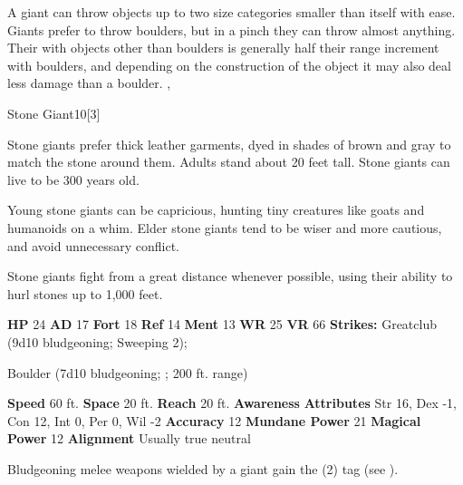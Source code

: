         A giant can throw objects up to two size categories smaller than itself with ease.
        Giants prefer to throw boulders, but in a pinch they can throw almost anything.
        Their  with objects other than boulders is generally half their range increment with boulders, and depending on the construction of the object it may also deal less damage than a boulder.
  ,
  \begin{monsubsection}{Stone Giant}{10}[3]
    \vspace{-1em}\vspace{-1em}
    \vspace{0em}

    
        Stone giants prefer thick leather garments, dyed in shades of brown and gray to match the stone around them. Adults stand about 20 feet tall. Stone giants can live to be 300 years old.

        Young stone giants can be capricious, hunting tiny creatures like goats and humanoids on a whim.
        Elder stone giants tend to be wiser and more cautious, and avoid unnecessary conflict.
      
        Stone giants fight from a great distance whenever possible, using their ability to hurl stones up to 1,000 feet.
      

    \begin{spellcontent}
      \begin{spelltargetinginfo}
        \pari \textbf{HP} 24 \monsep
          \textbf{AD} 17 \monsep
          \textbf{Fort} 18 \monsep
          \textbf{Ref} 14 \monsep
          \textbf{Ment} 13
        \pari \textbf{WR} 25 \monsep
        \textbf{VR} 66
        \pari \textbf{Strikes:}
            Greatclub  (9d10 bludgeoning; Sweeping 2);
\par Boulder  (7d10 bludgeoning; ; 200 ft. range)
      \end{spelltargetinginfo}
    \end{spellcontent}
    \begin{monsterfooter}
      \pari \textbf{Speed} 60 ft. \monsep
        \textbf{Space} 20 ft. \monsep
        \textbf{Reach} 20 ft.
      \pari \textbf{Awareness} 
      \pari \textbf{Attributes}
        Str 16, Dex -1,
        Con 12, Int 0,
        Per 0, Wil -2
      \pari \textbf{Accuracy} 12 \monsep
        \textbf{Mundane Power} 21 \monsep
      \textbf{Magical Power} 12
      \pari \textbf{Alignment} Usually true neutral
    \end{monsterfooter}
  \end{monsubsection}
        Bludgeoning melee weapons wielded by a giant gain the  (2) tag (see ).
      
